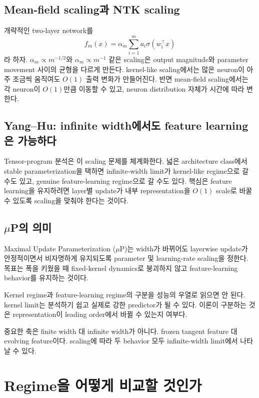 \documentclass[11pt,a4paper,oneside,openany]{memoir}
\theoremstyle{definition}
\begin{document}
\section{Mean-field scaling과 NTK scaling}
개략적인 two-layer network를
\[
f_m(x)=\alpha_m\sum_{i=1}^m a_i\sigma(w_i^\top x)
\]
라 하자. $\alpha_m\propto m^{-1/2}$와 $\alpha_m\propto m^{-1}$ 같은 scaling은 output magnitude와 parameter movement 사이의 균형을 다르게 만든다. kernel-like scaling에서는 많은 neuron이 아주 조금씩 움직여도 $O(1)$ 출력 변화가 만들어진다. 반면 mean-field scaling에서는 각 neuron이 $O(1)$만큼 이동할 수 있고, neuron distribution 자체가 시간에 따라 변한다.

\section{Yang--Hu: infinite width에서도 feature learning은 가능하다}
Tensor-program 분석은 이 scaling 문제를 체계화한다. 넓은 architecture class에서 stable parameterization을 택하면 infinite-width limit가 kernel-like regime으로 갈 수도 있고, genuine feature-learning regime으로 갈 수도 있다. 핵심은 feature learning을 유지하려면 layer별 update가 내부 representation을 $O(1)$ scale로 바꿀 수 있도록 scaling을 맞춰야 한다는 것이다.

\section{$\mu$P의 의미}
Maximal Update Parameterization ($\mu$P)는 width가 바뀌어도 layerwise update가 안정적이면서 비자명하게 유지되도록 parameter 및 learning-rate scaling을 정한다. 목표는 폭을 키웠을 때 fixed-kernel dynamics로 붕괴하지 않고 feature-learning behavior를 유지하는 것이다.

\begin{warningbox}
Kernel regime과 feature-learning regime의 구분을 성능의 우열로 읽으면 안 된다. kernel limit는 분석하기 쉽고 실제로 강한 predictor가 될 수 있다. 이론이 구분하는 것은 representation이 leading order에서 바뀔 수 있는지 여부다.
\end{warningbox}

\begin{presentbox}
중요한 축은 finite width 대 infinite width가 아니다. frozen tangent feature 대 evolving feature이다. scaling에 따라 두 behavior 모두 infinite-width limit에서 나타날 수 있다.
\end{presentbox}

\chapter{Regime을 어떻게 비교할 것인가}
\end{document}
